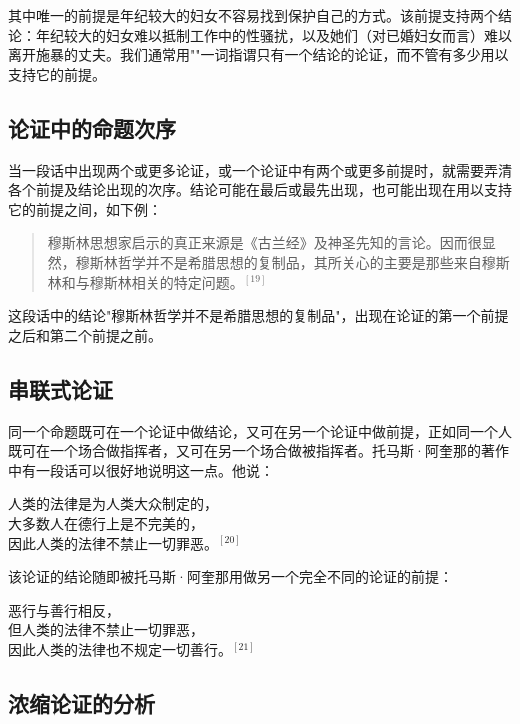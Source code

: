 其中唯一的前提是年纪较大的妇女不容易找到保护自己的方式。该前提支持两个结论：年纪较大的妇女难以抵制工作中的性骚扰，以及她们（对已婚妇女而言）难以离开施暴的丈夫。我们通常用""一词指谓只有一个结论的论证，而不管有多少用以支持它的前提。

\subsection{论证中的命题次序}

当一段话中出现两个或更多论证，或一个论证中有两个或更多前提时，就需要弄清各个前提及结论出现的次序。结论可能在最后或最先出现，也可能出现在用以支持它的前提之间，如下例：

\begin{quotation}
穆斯林思想家启示的真正来源是《古兰经》及神圣先知的言论。因而很显然，穆斯林哲学并不是希腊思想的复制品，其所关心的主要是那些来自穆斯林和与穆斯林相关的特定问题。${}^{[19]}$
\end{quotation}

这段话中的结论"穆斯林哲学并不是希腊思想的复制品"，出现在论证的第一个前提之后和第二个前提之前。

\subsection{串联式论证}

同一个命题既可在一个论证中做结论，又可在另一个论证中做前提，正如同一个人既可在一个场合做指挥者，又可在另一个场合做被指挥者。托马斯·阿奎那的著作中有一段话可以很好地说明这一点。他说：

\begin{displayquote}
人类的法律是为人类大众制定的，\\
大多数人在德行上是不完美的，\\
因此人类的法律不禁止一切罪恶。${}^{[20]}$
\end{displayquote}

该论证的结论随即被托马斯·阿奎那用做另一个完全不同的论证的前提：

\begin{displayquote}
恶行与善行相反，\\
但人类的法律不禁止一切罪恶，\\
因此人类的法律也不规定一切善行。${}^{[21]}$
\end{displayquote}

\subsection{浓缩论证的分析}

